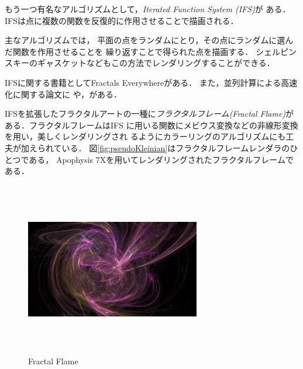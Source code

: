 もう一つ有名なアルゴリズムとして，{\it Iterated Function System (IFS)}が
ある．IFSは点に複数の関数を反復的に作用させることで描画される．

主なアルゴリズムでは，
平面の点をランダムにとり，その点にランダムに選んだ関数を作用させることを
繰り返すことで得られた点を描画する．
シェルピンスキーのギャスケットなどもこの方法でレンダリングすることができる．

IFSに関する書籍としてFractals Everywhere\cite{fractalsEverywhere}がある．
また，並列計算による高速化に関する論文に
\cite{highPerformanceIFS}や，\cite{GPUIFS}がある．

IFSを拡張したフラクタルアートの一種に\emph{フラクタルフレーム}{\it(Fractal
Flame)}\cite{fractalFlame}がある．フラクタルフレームはIFS
に用いる関数にメビウス変換などの非線形変換を用い，美しくレンダリングされ
るようにカラーリングのアルゴリズムにも工夫が加えられている．
図\ref{fig:pseudoKleinian}はフラクタルフレームレンダラのひとつである，
Apophysis 7Xを用いてレンダリングされたフラクタルフレームである．

\begin{figure}[htbp]
  \begin{center}
   \includegraphics[width=3in, height=3in, keepaspectratio]{../img/fractal/fractalFlame.pdf}
   \caption{Fractal Flame}
   \label{fig:fractalFlame}
  \end{center}
\end{figure}

\clearpage